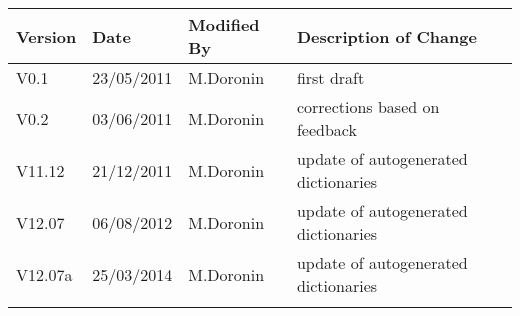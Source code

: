 {\begin{titlepage}
\end{titlepage}

\noindent \begin{tabular}{|l|l|l|l|} 
\hline 
\textbf{Version} & \textbf{Date} & \textbf{Modified By} & \textbf{Description of Change} \\ \hline 
V0.1 & 23/05/2011 & M.Doronin & first draft \\ \hline 
V0.2 & 03/06/2011 & M.Doronin & corrections based on feedback \\ \hline 
V11.12 & 21/12/2011 & M.Doronin & update of autogenerated dictionaries \\ \hline 
V12.07 & 06/08/2012 & M.Doronin & update of autogenerated dictionaries \\ \hline 
V12.07a & 25/03/2014 & M.Doronin & update of autogenerated dictionaries \\ \hline 
 &  &  &  \\ \hline 
\end{tabular}



}